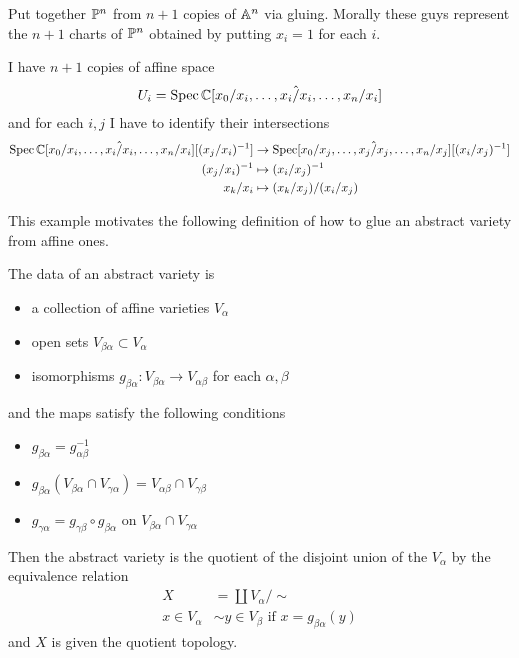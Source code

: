 \documentclass[12pt]{article}
\begin{document}
\begin{example}
	Put together $\P^n$ from $n+1$ copies of $\A^n$ via gluing. Morally these guys represent the $n+1$
	charts of $\P^n$ obtained by putting $x_i = 1$ for each $i$.

	\hfill

	I have $n+1$ copies of affine space \begin{align*}
		U_i = \Spec \C[x_0/x_i,\dots,\hat{x_i/x_i}, \dots,x_n/x_i]
	\end{align*} and for each $i,j$ I have to identify their intersections \begin{align*}
		\Spec \C[x_0/x_i,\dots,\hat{x_i/x_i}, \dots,x_n/x_i][(x_j/x_i)^{-1}] & \to \Spec [x_0/x_j,\dots,\hat{x_j/x_j}, \dots,x_n/x_j][(x_i/x_j)^{-1}] \\
		(x_j/x_i)^{-1}                                                       & \mapsto (x_i/x_j)^{-1}                                                 \\
		x_k/x_i                                                              & \mapsto (x_k/x_j)/(x_i/x_j)
	\end{align*}
\end{example}
This example motivates the following definition of how to glue an abstract variety from affine ones.

\hfill

The data of an abstract variety is \begin{itemize}
	\item a collection of affine varieties $V_\alpha$
	\item open sets $V_{\beta\alpha} \subset V_\alpha$
	\item isomorphisms $g_{\beta\alpha}: V_{\beta\alpha} \to V_{\alpha\beta}$ for each $\alpha,\beta$
\end{itemize} and the maps satisfy the following conditions \begin{itemize}
	\item $g_{\beta\alpha} = g_{\alpha\beta}^{-1}$
	\item $g_{\beta\alpha}(V_{\beta\alpha}\cap V_{\gamma\alpha}) = V_{\alpha\beta}\cap V_{\gamma\beta}$
	\item $g_{\gamma\alpha} = g_{\gamma\beta}\circ g_{\beta\alpha}$ on $V_{\beta\alpha}\cap V_{\gamma\alpha}$
\end{itemize} Then the abstract variety is the quotient of the disjoint union of the $V_\alpha$ by the equivalence relation \begin{align*}
	X             & = \coprod V_\alpha/\sim                              \\
	x\in V_\alpha & \sim y\in V_\beta \text{ if } x = g_{\beta\alpha}(y)
\end{align*} and $X$ is given the quotient topology.
\end{document}
